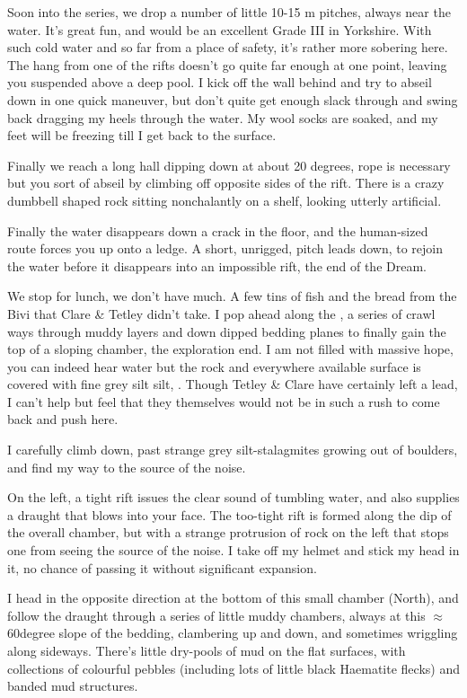 Soon into the  series, we drop a number of little 10-15 m pitches,
always near the water. It's great fun, and would be an excellent Grade
III in Yorkshire. With such cold water and so far from a place of
safety, it's rather more sobering here. The hang from one of the rifts
doesn't go quite far enough at one point, leaving you suspended above a
deep pool. I kick off the wall behind and try to abseil down in one
quick maneuver, but don't quite get enough slack through and swing back
dragging my heels through the water. My wool socks are soaked, and my
feet will be freezing till I get back to the surface.

Finally we reach a long hall dipping down at about 20 degrees, rope is
necessary but you sort of abseil by climbing off opposite sides of the
rift. There is a crazy dumbbell shaped rock sitting nonchalantly on a
shelf, looking utterly artificial.

Finally the water disappears down a crack in the floor, and the
human-sized route forces you up onto a ledge. A short, unrigged, pitch
leads down, to rejoin the water before it disappears into an impossible
rift, the end of the Dream.

We stop for lunch, we don't have much. A few tins of fish and the bread
from the Bivi that Clare \& Tetley didn't take. I pop ahead along the
, a series of crawl ways through muddy layers and down
dipped bedding planes to finally gain the top of a sloping chamber, the
exploration end. I am not filled with massive hope, you can indeed hear
water but the rock and everywhere available surface is covered with fine
grey silt silt, . Though Tetley \&
Clare have certainly left a lead, I can't help but feel that they
themselves would not be in such a rush to come back and push here.

I carefully climb down, past strange grey silt-stalagmites growing out
of boulders, and find my way to the source of the noise.

On the left, a tight rift issues the clear sound of tumbling water, and
also supplies a draught that blows into your face. The too-tight rift is
formed along the dip of the overall chamber, but with a strange
protrusion of rock on the left that stops one from seeing the source of
the noise. I take off my helmet and stick my head in it, no chance of
passing it without significant expansion.

I head in the opposite direction at the bottom of this small chamber
(North), and follow the draught through a series of little muddy
chambers, always at this $\approx$ 60degree slope of the bedding,
clambering up and down, and sometimes wriggling along sideways. There's
little dry-pools of mud on the flat surfaces, with collections of
colourful pebbles (including lots of little black Haematite flecks) and
banded mud structures.

